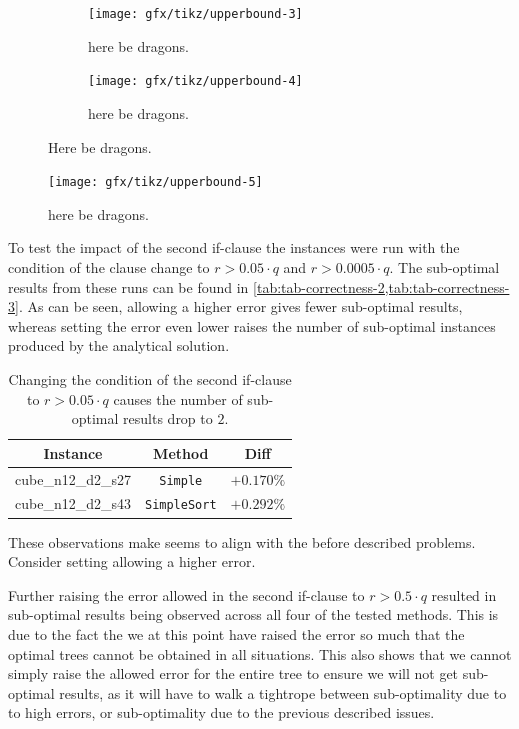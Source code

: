 \begin{figure}[htbp]
  \centering
  \begin{subfigure}[b]{0.4\textwidth}
    \texttt{[image: gfx/tikz/upperbound-3]}
    \caption{here be dragons.\label{fig:upperbound-3}}
  \end{subfigure}\hspace{1em}
  \begin{subfigure}[b]{0.4\textwidth}
    \texttt{[image: gfx/tikz/upperbound-4]}
    \caption{here be dragons.\label{fig:upperbound-4}}
  \end{subfigure}
  \caption[Upper bounds, 3 and 4]{Here be dragons.\label{fig:upperbound-3-4}}
\end{figure}

\begin{figure}[htbp]
  \centering
  \texttt{[image: gfx/tikz/upperbound-5]}
  \caption[Upper bounds, 5]{here be dragons.\label{fig:upperbound-5}}
\end{figure}

To test the impact of the second if-clause the instances were run with the
condition of the clause change to $r > 0.05 \cdot q$ and $r > 0.0005 \cdot q$.
The sub-optimal results from these runs can be found in
\cref{tab:tab-correctness-2,tab:tab-correctness-3}. As can be seen, allowing a
higher error gives fewer sub-optimal results, whereas setting the error even
lower raises the number of sub-optimal instances produced by the analytical
solution.

\begin{table}[htbp]
  \centering
  \begin{tabular}{ccc}
    \toprule
    Instance           & Method              & Diff       \\
    \midrule
    cube\_n12\_d2\_s27 & \texttt{Simple}     & $+0.170\%$ \\
    cube\_n12\_d2\_s43 & \texttt{SimpleSort} & $+0.292\%$ \\
    \bottomrule
  \end{tabular}
  \caption[Sub-optimal results with condition $r > 0.05 \cdot q$]{Changing
    the condition of the second if-clause to $r > 0.05 \cdot q$ causes the
    number of sub-optimal results drop to $2$.\label{tab:correctness-errors-3}}
\end{table}

These observations make seems to align with the before described problems.
Consider setting allowing a higher error. \TODO{}

Further raising the error allowed in the second if-clause to $r > 0.5 \cdot q$
resulted in sub-optimal results being observed across all four of the tested
methods. This is due to the fact the we at this point have raised the error so
much that the optimal trees cannot be obtained in all situations. This also
shows that we cannot simply raise the allowed error for the entire tree to
ensure we will not get sub-optimal results, as it will have to walk a tightrope
between sub-optimality due to to high errors, or sub-optimality due to the
previous described issues.

